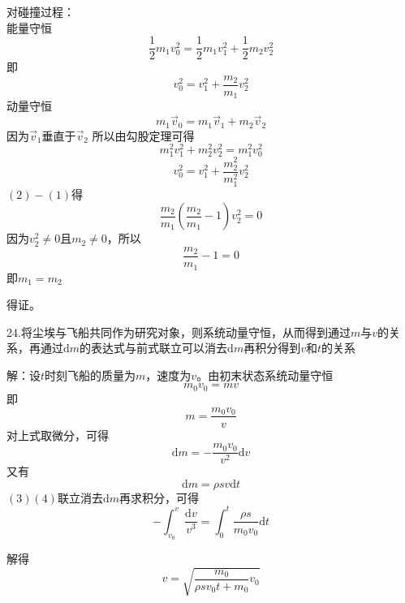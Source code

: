 \documentclass[b5paper,opensource]{./template/qyxf-book}
\newcommand{\di}[1]{\mathrm{d}#1}
\begin{document}
		对碰撞过程：\\能量守恒
		\begin{equation*}
		\frac{1}{2}m_1v_0^2=\frac{1}{2}m_1v_1^2+\frac{1}{2}m_2v_2^2
		\end{equation*}
		即
		\begin{equation}
		v_0^2=v_1^2+\frac{m_2}{m_1}v_2^2
		\end{equation}
		动量守恒
		\begin{equation*}
		m_1\vec{v}_0=m_1\vec{v}_1+m_2\vec{v}_2
		\end{equation*}
		因为$\vec{v}_1$垂直于$\vec{v}_2$
		所以由勾股定理可得
		\begin{equation*}
		m_1^2 v_1^2 + m_2^2 v_2^2 = m_1^2 v_0^2
		\end{equation*}
		\begin{equation}
		v_0^2=v_1^2+\frac{m_2^2}{m_1^2}v_2^2
		\end{equation}
		$(2)-(1)$得
		\begin{equation*}
		\frac{m_2}{m_1}(\frac{m_2}{m_1}-1)v_2^2=0
		\end{equation*}
		因为$v_2^2 \ne 0$且$m_2 \ne 0$，所以
		\begin{equation*}
		\frac{m_2}{m_1}-1=0
		\end{equation*}
		即$m_1=m_2$
		
		得证。
		
		24.\analysis 将尘埃与飞船共同作为研究对象，则系统动量守恒，从而得到通过$m$与$v$的关系，再通过$\di m$的表达式与前式联立可以消去$\di m$再积分得到$v$和$t$的关系
		
		解：设$t$时刻飞船的质量为$m$，速度为$v$。由初末状态系统动量守恒
		\begin{equation*}
		m_0 v_0=mv
		\end{equation*}
		即
		\begin{equation*}
		m=\frac{m_0 v_0}{v}
		\end{equation*}
		对上式取微分，可得
		\begin{equation}
		\di m=- \frac{m_0 v_0}{v^2} \di v
		\end{equation}
		又有
		\begin{equation}
		\di m=\rho sv\di t
		\end{equation}
		$(3)(4)$联立消去$\di m$再求积分，可得
		\begin{equation*}
		-\int_{v_0}^v \frac{\di v}{v^3}=\int_0^t \frac{\rho s}{m_0 v_0} \di t
		\end{equation*}
		
		解得
		\begin{equation*}
		v=\sqrt{\frac{m_0}{\rho sv_0 t+m_0}v_0}
		\end{equation*}
\end{document}
